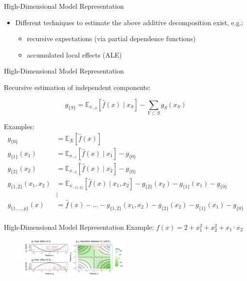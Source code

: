 \documentclass[11pt,compress,t,notes=noshow, aspectratio=169, xcolor=table]{beamer}
\begin{document}
\begin{frame}{High-Dimensional Model Representation }
\begin{itemize}
\item Different techniques to estimate the above additive decomposition exist, e.g.:
		\begin{itemize}
			\item recursive expectations (via partial dependence functions) 
			\item accumulated local effects (ALE)
		\end{itemize}
\end{itemize}
\end{frame}

\begin{frame}{High-Dimensional Model Representation}

Recursive estimation of independent components:

$$g_{\{S\}} = \mathbb{E}_{x_{-S}}\left[\widehat{f}(x) \; \vert  \; x_S \right] - \sum_{V \subset S} g_S(x_S)$$

Examples:
\begin{align*}
 g_{\{0\}} &= \mathbb{E}_X\left[\widehat{f}(x)\right] \\
 g_{\{1\}}(x_1) &= \mathbb{E}_{x_{-1}}\left[\widehat{f}(x) \; \vert  \; x_1 \right] - g_{\{0\}} \\
 g_{\{2\}}(x_2) &= \mathbb{E}_{x_{-2}}\left[\widehat{f}(x) \; \vert  \; x_2 \right] - g_{\{0\}} \\
 g_{\{1, 2\}}(x_1, x_2) &= \mathbb{E}_{x_{-\{1,2\}}}\left[\widehat{f}(x) \; \vert \; x_1, x_2 \right] - g_{\{2\}}(x_2) - g_{\{1\}}(x_1) - g_{\{0\}}\\
 &\vdots \\
 g_{\{1, \dots, p\}}(x) &= \widehat{f}(x) - \dots - g_{\{1, 2\}}(x_1, x_2) %
 - g_{\{2\}}(x_2) - g_{\{1\}}(x_1) - g_{\{0\}}\\
\end{align*}

\end{frame}

\begin{frame}{High-Dimensional Model Representation}
Example:
$f(x) = 2 + x_1^2 + x_2^2 + x_1 \cdot x_2$
\begin{figure}
\includegraphics[width = 0.5\textwidth]{figure/interaction2}
\end{figure}
\end{frame}
\end{document}

